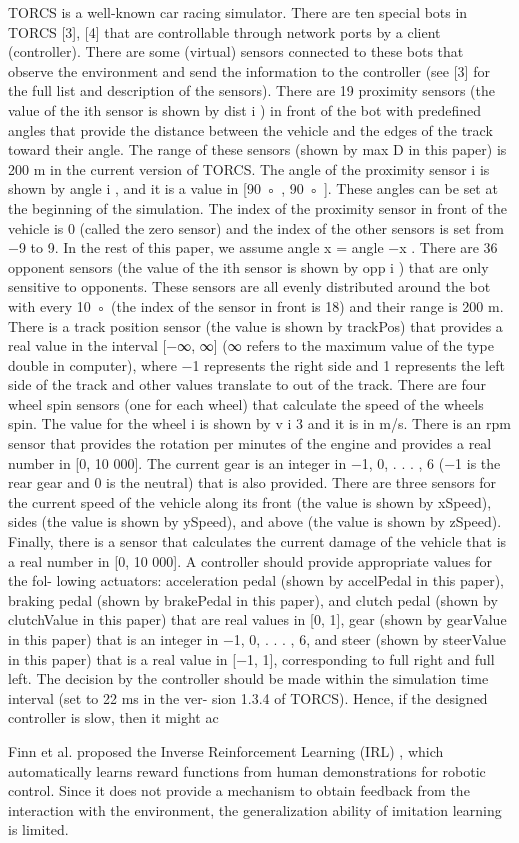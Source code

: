 TORCS is a well-known car racing simulator. There are ten
special bots in TORCS [3], [4] that are controllable through
network ports by a client (controller). There are some (virtual)
sensors connected to these bots that observe the environment and
send the information to the controller (see [3] for the full list
and description of the sensors). There are 19 proximity sensors
(the value of the ith sensor is shown by dist i ) in front of the bot
with predefined angles that provide the distance between the
vehicle and the edges of the track toward their angle. The range
of these sensors (shown by max D in this paper) is 200 m in the
current version of TORCS. The angle of the proximity sensor
i is shown by angle i , and it is a value in [90 ◦ , 90 ◦ ]. These
angles can be set at the beginning of the simulation. The index
of the proximity sensor in front of the vehicle is 0 (called the
zero sensor) and the index of the other sensors is set from −9 to
9. In the rest of this paper, we assume angle x = angle −x . There
are 36 opponent sensors (the value of the ith sensor is shown
by opp i ) that are only sensitive to opponents. These sensors are
all evenly distributed around the bot with every 10 ◦ (the index
of the sensor in front is 18) and their range is 200 m. There
is a track position sensor (the value is shown by trackPos) that
provides a real value in the interval [−∞, ∞] (∞ refers to the
maximum value of the type double in computer), where −1
represents the right side and 1 represents the left side of the
track and other values translate to out of the track. There are
four wheel spin sensors (one for each wheel) that calculate the
speed of the wheels spin. The value for the wheel i is shown
by v i 3 and it is in m/s. There is an rpm sensor that provides the
rotation per minutes of the engine and provides a real number in
[0, 10 000]. The current gear is an integer in {−1, 0, . . . , 6} (−1
is the rear gear and 0 is the neutral) that is also provided. There
are three sensors for the current speed of the vehicle along its
front (the value is shown by xSpeed), sides (the value is shown
by ySpeed), and above (the value is shown by zSpeed). Finally,
there is a sensor that calculates the current damage of the vehicle
that is a real number in [0, 10 000].
A controller should provide appropriate values for the fol-
lowing actuators: acceleration pedal (shown by accelPedal in
this paper), braking pedal (shown by brakePedal in this paper),
and clutch pedal (shown by clutchValue in this paper) that are
real values in [0, 1], gear (shown by gearValue in this paper) that
is an integer in {−1, 0, . . . , 6}, and steer (shown by steerValue
in this paper) that is a real value in [−1, 1], corresponding to
full right and full left. The decision by the controller should be
made within the simulation time interval (set to 22 ms in the ver-
sion 1.3.4 of TORCS). Hence, if the designed controller is slow,
then it might ac



Finn et al. proposed the Inverse Reinforcement Learning (IRL) \cite{inverse}, which automatically learns reward functions from human demonstrations for robotic control. Since it does not provide a mechanism to obtain feedback from the interaction with the environment, the generalization ability of imitation learning is limited.